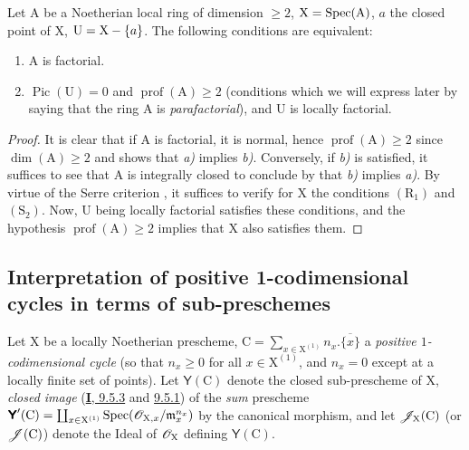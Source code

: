 \begin{corollary}[21.6.14]
\label{IV.21.6.14}
Let $\mathrm{A}$ be a Noetherian local ring of dimension $\geq 2$, $\mathrm{X}=\operatorname{Spec}(\mathrm{A})$, $a$ the closed point of $\mathrm{X}$, $\mathrm{U}=\mathrm{X}-\{a\}$.
The following conditions are equivalent:
\begin{enumerate}[label=\emph{\alph*)}]
  \item $\mathrm{A}$ is factorial.
  \item $\operatorname{Pic}(\mathrm{U})=0$ and $\operatorname{prof}(\mathrm{A})\geq 2$ \textup{(conditions which we will express later  by saying that the ring $\mathrm{A}$ is \emph{parafactorial})}, and $\mathrm{U}$ is locally factorial.
\end{enumerate}
\end{corollary}

\begin{proof}
It is clear that if $\mathrm{A}$ is factorial, it is normal, hence $\operatorname{prof}(\mathrm{A})\geq 2$ since $\dim(\mathrm{A})\geq 2$  and  shows that \emph{a)} implies \emph{b)}.
Conversely, if \emph{b)} is satisfied, it suffices to see that $\mathrm{A}$ is integrally closed to conclude by  that \emph{b)} implies \emph{a)}.
By virtue of the Serre criterion , it suffices to verify for $\mathrm{X}$ the conditions $(\mathrm{R}_1)$ and $(\mathrm{S}_2)$.
Now, $\mathrm{U}$ being locally factorial satisfies these conditions, and the hypothesis $\operatorname{prof}(\mathrm{A})\geq 2$ implies that $\mathrm{X}$ also satisfies them.
\end{proof}


\subsection{Interpretation of positive 1-codimensional cycles in terms of sub-preschemes}
\label{subsection:IV.21.7}
\label{IV.21.7}

\begin{env}[21.7.1]
\label{IV.21.7.1}
Let $\mathrm{X}$ be a locally Noetherian prescheme, $\mathrm{C}=\sum_{x\in\mathrm{X}^{(1)}}n_x.\overline{\{x\}}$ a \emph{positive $1$-codimensional cycle} (so that $n_x\geq 0$ for all $x\in\mathrm{X}^{(1)}$, and $n_x=0$ except at a locally finite set of points).
Let $\boldsymbol{\mathsf{Y}}(\mathrm{C})$ denote the closed sub-prescheme of $\mathrm{X}$, \emph{closed image} (\hyperref[I.9.5.3]{\textbf{I}, 9.5.3} and \hyperref[I.9.5.1]{9.5.1}) of the \emph{sum} prescheme $\boldsymbol{\mathsf{Y}}'(\mathrm{C})=\coprod_{x\in\mathrm{X}^{(1)}}\operatorname{Spec}(\mathscr{O}_{\mathrm{X},x}/\mathfrak{m}_x^{n_x})$ by the canonical morphism, and let $\mathscr{J}_\mathrm{X}(\mathrm{C})$ (or $\mathscr{J}(\mathrm{C})$) denote the Ideal of $\mathscr{O}_\mathrm{X}$ defining $\boldsymbol{\mathsf{Y}}(\mathrm{C})$.
\end{env}

